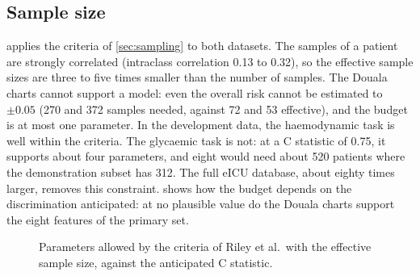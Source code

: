 \subsection{Sample size}\label{sec:results-sample-size}

 applies the criteria of \cref{sec:sampling} to both datasets. The samples of a patient are strongly correlated (intraclass correlation 0.13 to 0.32), so the effective sample sizes are three to five times smaller than the number of samples. The Douala charts cannot support a model: even the overall risk cannot be estimated to $\pm 0.05$ (270 and 372 samples needed, against 72 and 53 effective), and the budget is at most one parameter. In the development data, the haemodynamic task is well within the criteria. The glycaemic task is not: at a C statistic of 0.75, it supports about four parameters, and eight would need about 520 patients where the demonstration subset has 312. The full eICU database, about eighty times larger, removes this constraint.  shows how the budget depends on the discrimination anticipated: at no plausible value do the Douala charts support the eight features of the primary set.

\begin{figure}[htbp]
\centering
{}
\caption{Parameters allowed by the criteria of Riley et al.\ with the effective sample size, against the anticipated C statistic.}\label{fig:riley}
\end{figure}

